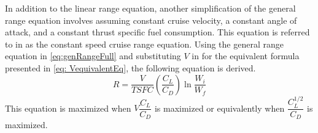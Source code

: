 In addition to the linear range equation, another simplification of the general range equation involves assuming constant cruise velocity, a constant angle of attack, and a constant thrust specific fuel consumption. This equation is referred to in \cite{IntroACMechanics} as the constant speed cruise range equation. Using the general range equation in \ref{eq:genRangeFull} and substituting $V$ in for the equivalent formula presented in \ref{eq: VequivalentEq}, the following equation is derived.
\begin{equation}
    R = \dfrac{V}{TSFC}\left(\dfrac{C_L}{C_D}\right)\ln{\dfrac{W_i}{W_f}}
    \label{eq: NLRange}
\end{equation}
This equation is maximized when $V\dfrac{C_L}{C_D}$ is maximized or equivalently when $\dfrac{C_L^{1/2}}{C_D}$ is maximized.

